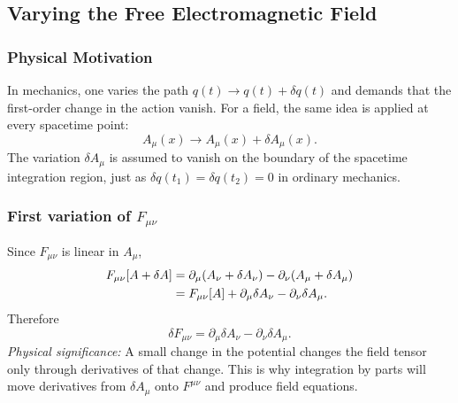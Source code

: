 \begin{center}
\end{center}

\subsection{Varying the Free Electromagnetic Field}\label{subsec:lec09-field-variation}

\subsubsection*{Physical Motivation}
In mechanics, one varies the path $q(t)\to q(t)+\delta q(t)$ and demands that
the first-order change in the action vanish.  For a field, the same idea is
applied at every spacetime point:
\begin{equation}\label{eq:lec09-A-variation}
  A_\mu(x)\longrightarrow A_\mu(x)+\delta A_\mu(x).
\end{equation}
The variation $\delta A_\mu$ is assumed to vanish on the boundary of the
spacetime integration region, just as $\delta q(t_1)=\delta q(t_2)=0$ in
ordinary mechanics.

\subsubsection*{First variation of $F_{\mu\nu}$}

Since $F_{\mu\nu}$ is linear in $A_\mu$,
\begin{align}
  F_{\mu\nu}[A+\delta A]
  &=
  \partial_\mu(A_\nu+\delta A_\nu)
  -\partial_\nu(A_\mu+\delta A_\mu) \notag\\
  &=
  F_{\mu\nu}[A]
  +\partial_\mu\delta A_\nu
  -\partial_\nu\delta A_\mu.
  \label{eq:lec09-F-var-expanded}
\end{align}
Therefore
\begin{equation}\label{eq:lec09-delta-F}
  \boxed{
  \delta F_{\mu\nu}
  =
  \partial_\mu\delta A_\nu-\partial_\nu\delta A_\mu .
  }
\end{equation}
\textit{Physical significance:} A small change in the potential changes the
field tensor only through derivatives of that change.  This is why integration
by parts will move derivatives from $\delta A_\mu$ onto $F^{\mu\nu}$ and produce
field equations.

